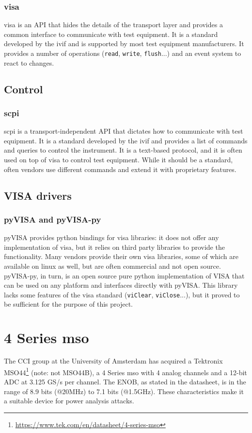 \documentclass[a4paper,english,twoside,10pt]{article}
\begin{document}
\subsubsection{\texorpdfstring{\gls{visa}}{VISA}}
\gls{visa} is an API that hides the details of the transport layer and provides a common interface to communicate with test equipment. It is a standard developed by the \gls{ivif} and is supported by most test equipment manufacturers. It provides a number of operations (\texttt{read}, \texttt{write}, \texttt{flush}...) and an event system to react to changes.

\subsection{Control}
\subsubsection{\texorpdfstring{\gls{scpi}}{SCPI}}\label{sec:scpi}
\gls{scpi} is a transport-independent API that dictates how to communicate with test equipment. It is a standard developed by the \gls{ivif} and provides a list of commands and queries to control the instrument. It is a text-based protocol, and it is often used on top of \gls{visa} to control test equipment. While it should be a standard, often vendors use different commands and extend it with proprietary features.

\subsection{VISA drivers}
\subsubsection{pyVISA and pyVISA-py}
pyVISA provides python bindings for \gls{visa} libraries: it does not offer any implementation of \gls{visa}, but it relies on third party libraries to provide the functionality. Many vendors provide their own \gls{visa} libraries, some of which are available on linux as well, but are often commercial and not open source. pyVISA-py, in turn, is an open source pure python implementation of VISA that can be used on any platform and interfaces directly with pyVISA. This library lacks some features of the \gls{visa} standard (\texttt{viClear}, \texttt{viClose}...), but it proved to be sufficient for the purpose of this project.

\section{4 Series \texorpdfstring{\gls{mso}}{MSO}}
The CCI group at the University of Amsterdam has acquired a Tektronix MSO44\footnote{\url{https://www.tek.com/en/datasheet/4-series-mso}} (note: not MSO44B), a 4 Series \gls{mso} with 4 analog channels and a 12-bit ADC at 3.125 GS/s per channel. The ENOB, as stated in the datasheet, is in the range of 8.9 bits (@20MHz) to 7.1 bits (@1.5GHz). These characteristics make it a suitable device for power analysis attacks.
\end{document}
